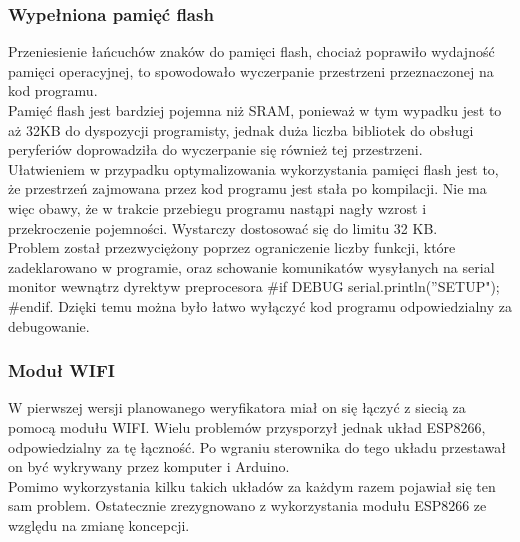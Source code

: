 \documentclass[declaration,shortabstract, mgr]{iithesis}
\begin{document}
\subsubsection{Wypełniona pamięć flash}
\indent Przeniesienie łańcuchów znaków do pamięci flash, chociaż poprawiło wydajność pamięci operacyjnej, to spowodowało wyczerpanie przestrzeni przeznaczonej na kod programu. \\
\indent Pamięć flash jest bardziej pojemna niż SRAM, ponieważ w tym wypadku jest to aż 32KB do dyspozycji programisty, jednak duża liczba bibliotek do obsługi peryferiów doprowadziła do wyczerpanie się również tej przestrzeni. \\
\indent Ułatwieniem w przypadku optymalizowania wykorzystania pamięci flash jest to, że przestrzeń zajmowana przez kod programu jest stała po kompilacji. Nie ma więc obawy, że w trakcie przebiegu programu nastąpi nagły wzrost i przekroczenie pojemności. Wystarczy dostosować się do limitu 32 KB. \\
\indent Problem został przezwyciężony poprzez ograniczenie liczby funkcji, które zadeklarowano w programie, oraz schowanie komunikatów wysyłanych na serial monitor wewnątrz dyrektyw preprocesora \#if DEBUG serial.println(''SETUP"); \#endif. Dzięki temu można było łatwo wyłączyć kod programu odpowiedzialny za debugowanie.\\
\subsubsection{Moduł WIFI}
\indent W pierwszej wersji planowanego weryfikatora miał on się łączyć z siecią za pomocą modułu WIFI. Wielu problemów przysporzył jednak układ ESP8266, odpowiedzialny za tę łączność. Po wgraniu sterownika do tego układu przestawał on być wykrywany przez komputer i Arduino.\\ 
\indent Pomimo wykorzystania kilku takich układów za każdym razem pojawiał się ten sam problem. Ostatecznie zrezygnowano z wykorzystania modułu ESP8266 ze względu na zmianę koncepcji.
\end{document}
